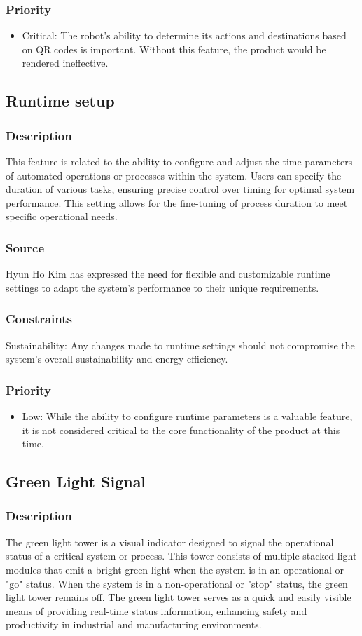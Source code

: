 \subsubsection{Priority}
\begin{itemize}
\item Critical:
The robot's ability to determine its actions and destinations based on QR codes is important. Without this feature, the product would be rendered ineffective.
\end{itemize}
\subsection{Runtime setup}
\subsubsection{Description}
This feature is related to the ability to configure and adjust the time parameters of automated operations or processes within the system. Users can specify the duration of various tasks, ensuring precise control over timing for optimal system performance. This setting allows for the fine-tuning of process duration to meet specific operational needs.
\subsubsection{Source}
Hyun Ho Kim has expressed the need for flexible and customizable runtime settings to adapt the system's performance to their unique requirements. 
\subsubsection{Constraints}
Sustainability: Any changes made to runtime settings should not compromise the system's overall sustainability and energy efficiency.
\subsubsection{Priority}
\begin{itemize}
\item Low:
While the ability to configure runtime parameters is a valuable feature, it is not considered critical to the core functionality of the product at this time.
\end{itemize}
\subsection{Green Light Signal}
\subsubsection{Description}
The green light tower is a visual indicator designed to signal the operational status of a critical system or process. This tower consists of multiple stacked light modules that emit a bright green light when the system is in an operational or "go" status. When the system is in a non-operational or "stop" status, the green light tower remains off. The green light tower serves as a quick and easily visible means of providing real-time status information, enhancing safety and productivity in industrial and manufacturing environments.
